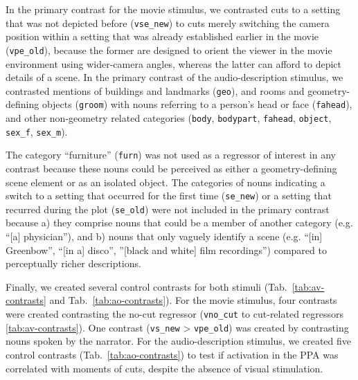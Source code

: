 \documentclass[english]{article}
\begin{document}
In the primary contrast for the movie stimulus, we contrasted cuts to a setting
that was not depicted before (\texttt{vse\_new}) to cuts merely switching the
camera position within a setting that was already established earlier in the
movie (\texttt{vpe\_old}), because the former are designed to orient the viewer
in the movie environment using wider-camera angles, whereas the latter can
afford to depict details of a scene.
In the primary contrast of the audio-description stimulus, we contrasted
mentions of buildings and landmarks (\texttt{geo}), and rooms and
geometry-defining objects (\texttt{groom}) with nouns referring to a
person's head or face (\texttt{fahead}), and other non-geometry related
categories (\texttt{body}, \texttt{bodypart}, \texttt{fahead}, \texttt{object},
\texttt{sex\_f}, \texttt{sex\_m}).

The category ``furniture'' (\texttt{furn}) was not used as a regressor of
interest in any contrast because these nouns could be perceived as either a
geometry-defining scene element or as an isolated object.
The categories of nouns indicating a switch to a setting that occurred for the
first time (\texttt{se\_new}) or a setting that recurred during the plot
(\texttt{se\_old}) were not included in the primary contrast because
a) they comprise nouns that could be a member of another category (e.g. ``[a]
physician''), and
b) nouns that only vaguely identify a scene (e.g. ``[in] Greenbow'', ``[in a]
disco'', ''[black and white] film recordings'') compared to perceptually richer
descriptions.

Finally, we created several control contrasts for both stimuli
(Tab.~\ref{tab:av-contrasts} and Tab.~\ref{tab:ao-contrasts}).
For the movie stimulus, four contrasts were created contrasting the no-cut
regressor (\texttt{vno\_cut} to cut-related regressors \ref{tab:av-contrasts}).
One contrast (\texttt{vs\_new} > \texttt{vpe\_old}) was created by contrasting
nouns spoken by the narrator.
For the audio-description stimulus, we created five control contrasts
(Tab.~\ref{tab:ao-contrasts}) to test if activation in the PPA was
correlated with moments of cuts, despite the absence of visual stimulation.
\end{document}
